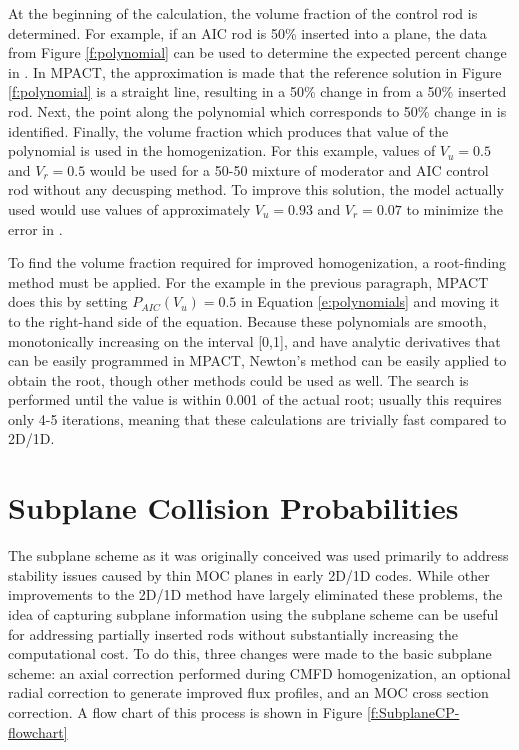 At the beginning of the calculation, the volume fraction of the control rod is determined.  For example, if an AIC rod is 50\% inserted into a plane, the data from Figure \ref{f:polynomial} can be used to determine the expected percent change in \keff{}.  In MPACT, the approximation is made that the reference solution in Figure \ref{f:polynomial} is a straight line, resulting in a 50\% change in \keff{} from a 50\% inserted rod.  Next, the point along the polynomial which corresponds to 50\% change in \keff{} is identified.  Finally, the volume fraction which produces that value of the polynomial is used in the homogenization.  For this example, values of $V_u=0.5$ and $V_r=0.5$ would be used for a 50-50 mixture of moderator and AIC control rod without any decusping method.  To improve this solution, the model actually used would use values of approximately $V_u=0.93$ and $V_r=0.07$ to minimize the error in \keff{}.

To find the volume fraction required for improved homogenization, a root-finding method must be applied.  For the example in the previous paragraph, MPACT does this by setting $P_{AIC}\left(V_u\right) = 0.5$ in Equation \ref{e:polynomials} and moving it to the right-hand side of the equation.  Because these polynomials are smooth, monotonically increasing on the interval [0,1], and have analytic derivatives that can be easily programmed in MPACT, Newton's method \cite{2006friendlyIntroductionToNumericalAnalysis} can be easily applied to obtain the root, though other methods could be used as well.  The search is performed until the value is within 0.001 of the actual root; usually this requires only 4-5 iterations, meaning that these calculations are trivially fast compared to 2D/1D.

\section{Subplane Collision Probabilities}

The subplane scheme as it was originally conceived was used primarily to address stability issues caused by thin MOC planes in early 2D/1D codes.  While other improvements to the 2D/1D method have largely eliminated these problems, the idea of capturing subplane information using the subplane scheme can be useful for addressing partially inserted rods without substantially increasing the computational cost.  To do this, three changes were made to the basic subplane scheme: an axial correction performed during CMFD homogenization, an optional radial correction to generate improved flux profiles, and an MOC cross section correction.  A flow chart of this process is shown in Figure \ref{f:SubplaneCP-flowchart}

